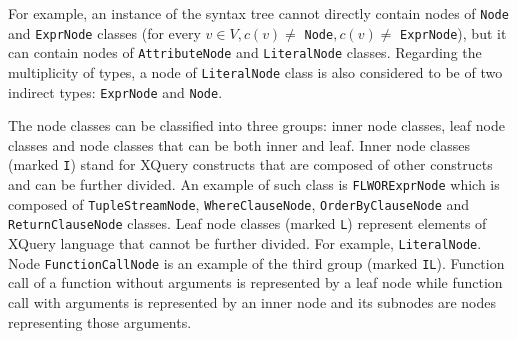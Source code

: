 For example, an instance of the syntax tree cannot directly contain nodes of \texttt{Node} and \texttt{ExprNode} classes (for every $v \in V, c(v) \neq$ \texttt{Node}$, c(v) \neq$ \texttt{ExprNode}), but it can contain nodes of \texttt{AttributeNode} and \texttt{LiteralNode} classes. Regarding the multiplicity of types, a node of \texttt{LiteralNode} class is also considered to be of two indirect types: \texttt{ExprNode} and \texttt{Node}.


The node classes can be classified into three groups: inner node classes, leaf node classes and node classes that can be both inner and leaf. Inner node classes (marked \texttt{I}) stand for XQuery constructs that are composed of other constructs and can be further divided. An example of such class is \texttt{FLWORExprNode} which is composed of \texttt{TupleStreamNode}, \texttt{WhereClauseNode}, \texttt{OrderByClauseNode} and \texttt{ReturnClauseNode} classes. Leaf node classes (marked \texttt{L}) represent elements of XQuery language that cannot be further divided. For example, \texttt{LiteralNode}. Node \texttt{FunctionCallNode} is an example of the third group (marked \texttt{IL}). Function call of a function without arguments is represented by a leaf node while function call with arguments is represented by an inner node and its subnodes are nodes representing those arguments.

